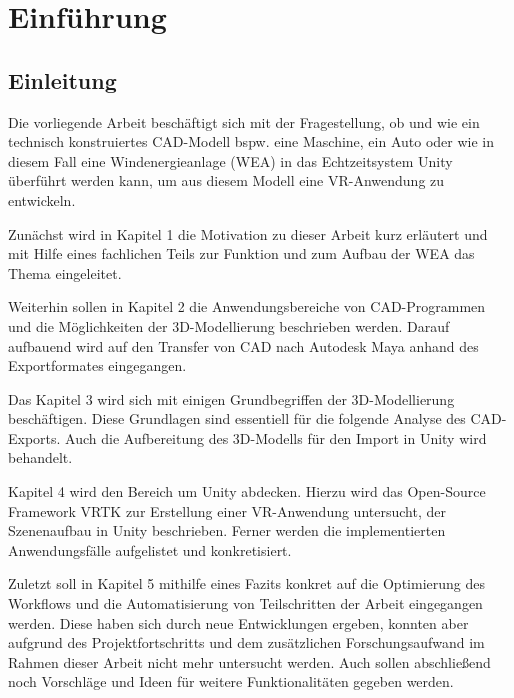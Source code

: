 \chapter{Einführung}
\section{Einleitung}
\label{sec:Einleitung}
Die vorliegende Arbeit beschäftigt sich mit der Fragestellung, ob und wie ein technisch konstruiertes CAD-Modell bspw. eine Maschine, ein Auto oder wie in diesem Fall eine Windenergieanlage (WEA) in das Echtzeitsystem Unity überführt werden kann, um aus diesem Modell eine VR-Anwendung zu entwickeln.
 
Zunächst wird in Kapitel 1 die Motivation zu dieser Arbeit kurz erläutert und mit Hilfe eines fachlichen Teils zur Funktion und zum Aufbau der WEA das Thema eingeleitet. 

Weiterhin sollen in Kapitel 2 die Anwendungsbereiche von CAD-Programmen und die Möglichkeiten der 3D-Modellierung beschrieben werden. Darauf aufbauend wird auf den Transfer von CAD nach Autodesk Maya anhand des Exportformates eingegangen.

Das Kapitel 3 wird sich mit einigen Grundbegriffen der 3D-Modellierung beschäftigen. Diese Grundlagen sind essentiell für die folgende Analyse des CAD-Exports. Auch die Aufbereitung des 3D-Modells für den Import in Unity wird behandelt.

Kapitel 4 wird den Bereich um Unity abdecken. Hierzu wird das Open-Source Framework VRTK zur Erstellung einer VR-Anwendung untersucht, der Szenenaufbau in Unity beschrieben. Ferner werden die implementierten Anwendungsfälle aufgelistet und konkretisiert.

Zuletzt soll in Kapitel 5 mithilfe eines Fazits konkret auf die Optimierung des Workflows und die Automatisierung von Teilschritten der Arbeit eingegangen werden. Diese haben sich durch neue Entwicklungen ergeben, konnten aber aufgrund des Projektfortschritts und dem zusätzlichen Forschungsaufwand im Rahmen dieser Arbeit  nicht mehr untersucht werden. Auch sollen abschließend noch Vorschläge und Ideen für weitere Funktionalitäten gegeben werden.


